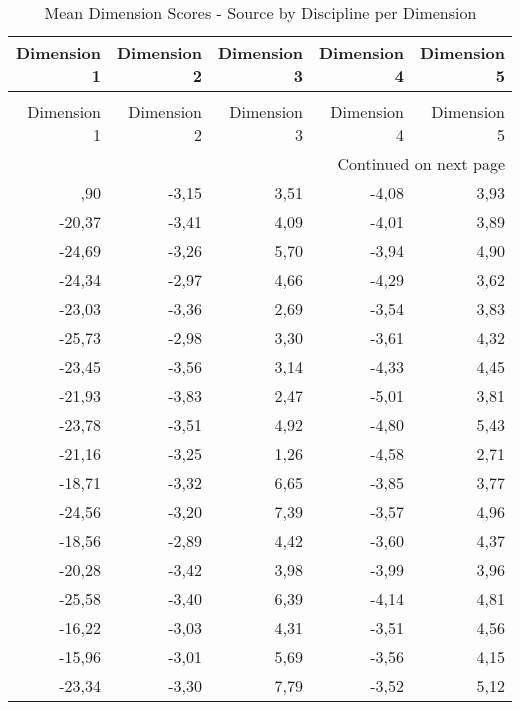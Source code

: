 \begin{longtable}{rrrrr}
\caption{Mean Dimension Scores - Source by Discipline per Dimension} \label{tab:df_mean_dimension_score} \\
\toprule
Dimension 1 & Dimension 2 & Dimension 3 & Dimension 4 & Dimension 5 \\
\midrule
\endfirsthead
\caption[]{Mean Dimension Scores - Source by Discipline per Dimension} \\
\toprule
Dimension 1 & Dimension 2 & Dimension 3 & Dimension 4 & Dimension 5 \\
\midrule
\endhead
\midrule
\multicolumn{5}{r}{Continued on next page} \\
\midrule
\endfoot
\bottomrule
\endlastfoot
-20,90 & -3,15 & 3,51 & -4,08 & 3,93 \\
-20,37 & -3,41 & 4,09 & -4,01 & 3,89 \\
-24,69 & -3,26 & 5,70 & -3,94 & 4,90 \\
-24,34 & -2,97 & 4,66 & -4,29 & 3,62 \\
-23,03 & -3,36 & 2,69 & -3,54 & 3,83 \\
-25,73 & -2,98 & 3,30 & -3,61 & 4,32 \\
-23,45 & -3,56 & 3,14 & -4,33 & 4,45 \\
-21,93 & -3,83 & 2,47 & -5,01 & 3,81 \\
-23,78 & -3,51 & 4,92 & -4,80 & 5,43 \\
-21,16 & -3,25 & 1,26 & -4,58 & 2,71 \\
-18,71 & -3,32 & 6,65 & -3,85 & 3,77 \\
-24,56 & -3,20 & 7,39 & -3,57 & 4,96 \\
-18,56 & -2,89 & 4,42 & -3,60 & 4,37 \\
-20,28 & -3,42 & 3,98 & -3,99 & 3,96 \\
-25,58 & -3,40 & 6,39 & -4,14 & 4,81 \\
-16,22 & -3,03 & 4,31 & -3,51 & 4,56 \\
-15,96 & -3,01 & 5,69 & -3,56 & 4,15 \\
-23,34 & -3,30 & 7,79 & -3,52 & 5,12 \\
\end{longtable}
